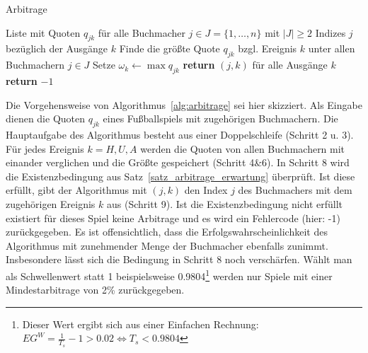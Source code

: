 \begin{algorithm}
\caption{Arbitrage}\label{alg:arbitrage}
\begin{algorithmic}[1]
\Require Liste mit Quoten $q_{jk}$ für alle Buchmacher $j \in J=\{1,\dots,n\}$ mit $ |J| \geq 2 $
\Ensure Indizes $j$ bezüglich der Ausgänge $k$
		\State Finde die größte Quote $q_{jk}$ bzgl. Ereignis $k$ unter allen Buchmachern $j \in J$
	\EndFor
	\State Setze $\omega_k \gets \max{q_{jk}}$
\EndFor
{}
	\State \textbf{return} $(j,k)$ für alle Ausgänge $k$
	\Else
		\State \textbf{return} $-1$
\EndIf
\EndProcedure
\end{algorithmic}
\end{algorithm}

Die Vorgehensweise von Algorithmus~\ref{alg:arbitrage} sei hier skizziert. Als Eingabe dienen die Quoten $ q_{jk} $ eines Fußballspiels mit zugehörigen Buchmachern. Die Hauptaufgabe des Algorithmus besteht aus einer Doppelschleife (Schritt 2 u. 3). Für jedes Ereignis $ k=H,U,A $ werden die Quoten von allen Buchmachern mit einander verglichen und die Größte gespeichert (Schritt 4\&6). In Schritt 8 wird die Existenzbedingung aus Satz~\ref{satz_arbitrage_erwartung} überprüft. Ist diese erfüllt, gibt der Algorithmus mit $ (j,k) $ den Index $ j $ des Buchmachers mit dem zugehörigen Ereignis $ k $ aus (Schritt 9). Ist die Existenzbedingung nicht erfüllt existiert für dieses Spiel keine Arbitrage und es wird ein Fehlercode (hier: -1) zurückgegeben. Es ist offensichtlich, dass die Erfolgswahrscheinlichkeit des Algorithmus mit zunehmender Menge der Buchmacher ebenfalls zunimmt. Insbesondere lässt sich die Bedingung in Schritt 8 noch verschärfen. Wählt man als Schwellenwert statt 1 beispielsweise 0.9804\footnote{Dieser Wert ergibt sich aus einer Einfachen Rechnung: $ EG^W = \tfrac{1}{T_s} - 1 > 0.02 \Leftrightarrow T_s < 0.9804 $} werden nur Spiele mit einer Mindestarbitrage von 2\% zurückgegeben.


